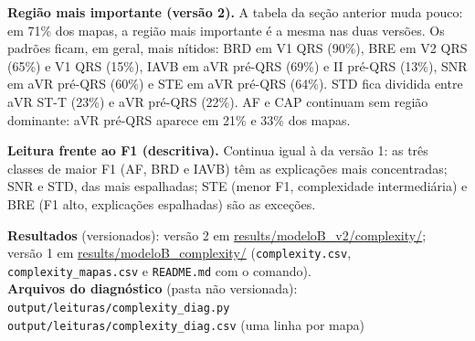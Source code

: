 \documentclass[11pt,a4paper]{article}
\begin{document}
\textbf{Região mais importante (versão 2).} A tabela da seção anterior muda pouco: em 71\% dos mapas, a região mais importante é a mesma nas duas versões. Os padrões ficam, em geral, mais nítidos: BRD em V1 QRS (90\%), BRE em V2 QRS (65\%) e V1 QRS (15\%), IAVB em aVR pré-QRS (69\%) e II pré-QRS (13\%), SNR em aVR pré-QRS (60\%) e STE em aVR pré-QRS (64\%). STD fica dividida entre aVR ST-T (23\%) e aVR pré-QRS (22\%). AF e CAP continuam sem região dominante: aVR pré-QRS aparece em 21\% e 33\% dos mapas.

\textbf{Leitura frente ao F1 (descritiva).} Continua igual à da versão 1: as três classes de maior F1 (AF, BRD e IAVB) têm as explicações mais concentradas; SNR e STD, das mais espalhadas; STE (menor F1, complexidade intermediária) e BRE (F1 alto, explicações espalhadas) são as exceções.

\vspace{0.5em}
{\small \textbf{Resultados} (versionados): versão 2 em \url{results/modeloB_v2/complexity/}; \\ versão 1 em \url{results/modeloB_complexity/} (\texttt{complexity.csv}, \texttt{complexity\_mapas.csv} e \texttt{README.md} com o comando). \\
\textbf{Arquivos do diagnóstico} (pasta não versionada): \\ \texttt{output/leituras/complexity\_diag.py} \\ \texttt{output/leituras/complexity\_diag.csv} (uma linha por mapa)}
\end{document}
